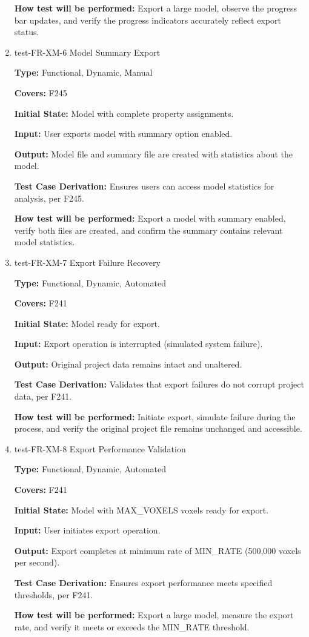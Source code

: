 \documentclass[12pt, titlepage]{article}
\begin{document}
\begin{enumerate}
\textbf{How test will be performed:} Export a large model, observe the progress bar updates, and verify the progress indicators accurately reflect export status.

\item{test-FR-XM-6 Model Summary Export\\}

\textbf{Type:} Functional, Dynamic, Manual

\textbf{Covers:} F245
					
\textbf{Initial State:} Model with complete property assignments.
					
\textbf{Input:} User exports model with summary option enabled.
					
\textbf{Output:} Model file and summary file are created with statistics about the model.

\textbf{Test Case Derivation:} Ensures users can access model statistics for analysis, per F245.
					
\textbf{How test will be performed:} Export a model with summary enabled, verify both files are created, and confirm the summary contains relevant model statistics.

\item{test-FR-XM-7 Export Failure Recovery\\}

\textbf{Type:} Functional, Dynamic, Automated

\textbf{Covers:} F241
					
\textbf{Initial State:} Model ready for export.
					
\textbf{Input:} Export operation is interrupted (simulated system failure).
					
\textbf{Output:} Original project data remains intact and unaltered.

\textbf{Test Case Derivation:} Validates that export failures do not corrupt project data, per F241.
					
\textbf{How test will be performed:} Initiate export, simulate failure during the process, and verify the original project file remains unchanged and accessible.

\item{test-FR-XM-8 Export Performance Validation\\}

\textbf{Type:} Functional, Dynamic, Automated

\textbf{Covers:} F241
					
\textbf{Initial State:} Model with MAX\_VOXELS voxels ready for export.
					
\textbf{Input:} User initiates export operation.
					
\textbf{Output:} Export completes at minimum rate of MIN\_RATE (500,000 voxels per second).

\textbf{Test Case Derivation:} Ensures export performance meets specified thresholds, per F241.
					
\textbf{How test will be performed:} Export a large model, measure the export rate, and verify it meets or exceeds the MIN\_RATE threshold.

\end{enumerate}
\end{document}
